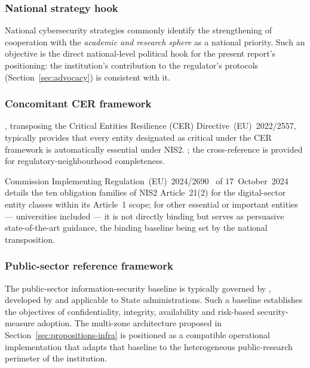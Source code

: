 \subsubsection{National strategy hook}

National cybersecurity strategies commonly identify the strengthening
of cooperation with the \emph{academic and research sphere} as a
national priority. Such an objective is the direct national-level
political hook for the present report's positioning: the institution's
contribution to the regulator's protocols (Section~\ref{sec:advocacy})
is consistent with it.

\subsubsection{Concomitant CER framework}

, transposing the Critical Entities
Resilience (CER) Directive~(EU)~2022/2557, typically provides that every entity
designated as critical under the CER framework is automatically
essential under NIS2. ; the cross-reference is provided for
regulatory-neighbourhood completeness.

Commission Implementing
Regulation~(EU)~2024/2690~\cite{eu-regulation-2024-2690} of
17~October~2024 details the ten obligation families of NIS2
Article~21(2) for the digital-sector entity classes within its
Article~1 scope; for other essential or important entities ---
universities included --- it is not directly binding but serves as
persuasive state-of-the-art guidance, the binding baseline being set
by the national transposition.

\subsubsection{Public-sector reference framework}

The public-sector information-security baseline is typically governed
by , developed
by  and applicable to State
administrations. Such a baseline establishes the objectives of
confidentiality, integrity, availability and risk-based
security-measure adoption. The multi-zone architecture
proposed in Section~\ref{sec:propositions-infra} is positioned as a
compatible operational implementation that adapts that baseline
to the heterogeneous public-research perimeter of the institution.

